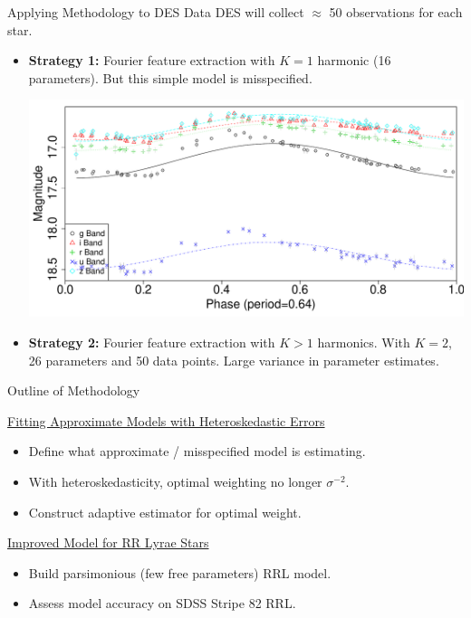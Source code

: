 \documentclass[12pt]{beamer}
\begin{document}
\begin{frame}{Applying Methodology to DES Data}
  DES will collect $\approx$ 50 observations for each star.

  \begin{itemize}
    \item \textbf{Strategy 1:} Fourier feature extraction with $K=1$ harmonic (16 parameters). But this simple model is misspecified.

  \begin{center}
    \includegraphics[scale=.25]{figs/rrlyrae_model_fit_sine.pdf}
  \end{center}

\item \textbf{Strategy 2:} Fourier feature extraction with $K>1$ harmonics. With $K=2$, 26 parameters and 50 data points. Large variance in parameter estimates.
  \end{itemize}
\end{frame}


\begin{frame}{Outline of Methodology}

\underline{Fitting Approximate Models with Heteroskedastic Errors}\\
\begin{itemize}
\item Define what approximate / misspecified model is estimating.
\item With heteroskedasticity, optimal weighting no longer $\sigma^{-2}$.
\item Construct adaptive estimator for optimal weight.
\end{itemize}


\vspace{.2in}

\underline{Improved Model for RR Lyrae Stars}
\begin{itemize}
\item Build parsimonious (few free parameters) RRL model.
\item Assess model accuracy on SDSS Stripe 82 RRL.
\end{itemize}

\end{frame}
\end{document}
